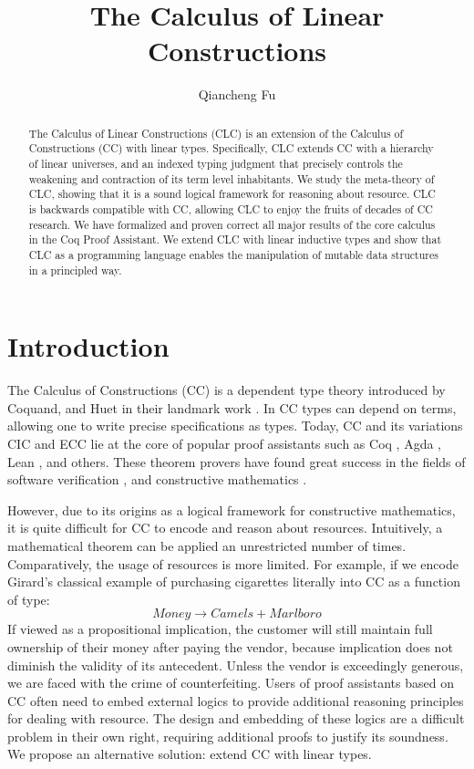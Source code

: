 \documentclass{article}
\title{The Calculus of Linear Constructions}
\author{Qiancheng Fu}
\theoremstyle{definition}
\begin{document}
  \maketitle 
  \begin{abstract}
    The Calculus of Linear Constructions (CLC) is an extension of the Calculus of Constructions (CC) with linear types. Specifically, CLC extends CC with a hierarchy of linear universes, and an indexed typing judgment that precisely controls the weakening and contraction of its term level inhabitants. We study the meta-theory of CLC, showing that it is a sound logical framework for reasoning about resource. CLC is backwards compatible with CC, allowing CLC to enjoy the fruits of decades of CC research. We have formalized and proven correct all major results of the core calculus in the Coq Proof Assistant. We extend CLC with linear inductive types and show that CLC as a programming language enables the manipulation of mutable data structures in a principled way.
  \end{abstract}

  \section{Introduction}
  The Calculus of Constructions (CC) is a dependent type theory introduced by Coquand, and Huet in their landmark work \cite{cc}. In CC types can depend on terms, allowing one to write precise specifications as types. Today, CC and its variations CIC \cite{cic} and ECC \cite{ecc} lie at the core of popular proof assistants such as Coq \cite{coq}, Agda \cite{agda}, Lean \cite{lean}, and others. These theorem provers have found great success in the fields of software verification \cite{compcert,deepspec}, and constructive mathematics \cite{four-color,schemes}. 
  
  However, due to its origins as a logical framework for constructive mathematics, it is quite difficult for CC to encode and reason about resources. Intuitively, a mathematical theorem can be applied an unrestricted number of times. Comparatively, the usage of resources is more limited. For example, if we encode Girard's classical example \cite{girard95} of purchasing cigarettes literally into CC as a function of type:
  \begin{equation*}
    Money \rightarrow Camels + Marlboro
  \end{equation*}
  If viewed as a propositional implication, the customer will still maintain full ownership of their money after paying the vendor, because implication does not diminish the validity of its antecedent. Unless the vendor is exceedingly generous, we are faced with the crime of counterfeiting. Users of proof assistants based on CC often need to embed external logics \cite{iris} to provide additional reasoning principles for dealing with resource. The design and embedding of these logics are a difficult problem in their own right, requiring additional proofs to justify its soundness. We propose an alternative solution: extend CC with linear types.
\end{document}
